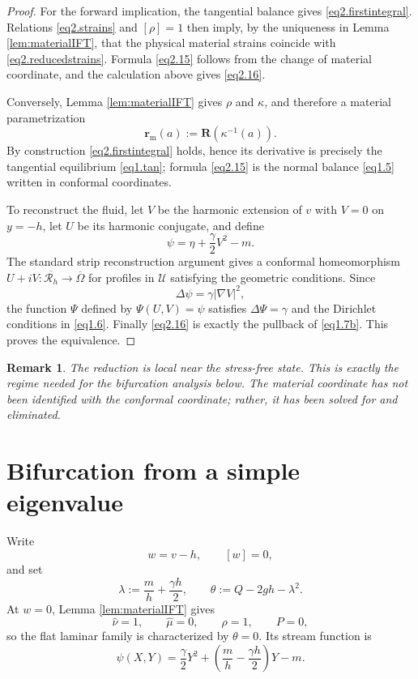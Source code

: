 \documentclass[12pt]{article}
\numberwithin{equation}{section}
\newtheorem{remark}[theorem]{Remark}
\numberwithin{equation}{section}
\begin{document}
\begin{proof}
For the forward implication, the tangential balance gives
\eqref{eq2.firstintegral}.  Relations \eqref{eq2.strains} and $[\rho]=1$ then imply,
by the uniqueness in Lemma \ref{lem:materialIFT}, that the physical material strains
coincide with \eqref{eq2.reducedstrains}.  Formula \eqref{eq2.15} follows from the
change of material coordinate, and the calculation above gives \eqref{eq2.16}.

Conversely, Lemma \ref{lem:materialIFT} gives $\rho$ and $\kappa$, and therefore a
material parametrization
\[
\mathbf r_{\mathrm m}(a)
:=\mathbf R(\kappa^{-1}(a)).
\]
By construction \eqref{eq2.firstintegral} holds, hence its derivative is precisely
the tangential equilibrium \eqref{eq1.tan}; formula \eqref{eq2.15} is the normal
balance \eqref{eq1.5} written in conformal coordinates.

To reconstruct the fluid, let $V$ be the harmonic extension of $v$ with $V=0$ on
$y=-h$, let $U$ be its harmonic conjugate, and define
\[
\psi=\eta+\frac{\gamma}{2}V^2-m.
\]
The standard strip reconstruction argument
\cite[Appendix A]{ConstantinV} gives a conformal homeomorphism
$U+iV:\overline{\mathcal R_h}\to\overline\Omega$ for profiles in $\mathcal U$ satisfying
the geometric conditions.  Since
\[
\Delta\psi=\gamma|\nabla V|^2,
\]
the function $\Psi$ defined by $\Psi(U,V)=\psi$ satisfies $\Delta\Psi=\gamma$ and the
Dirichlet conditions in \eqref{eq1.6}.  Finally \eqref{eq2.16} is exactly the pullback
of \eqref{eq1.7b}.  This proves the equivalence.
\end{proof}

\begin{remark}
The reduction is local near the stress-free state.  This is exactly the regime needed
for the bifurcation analysis below.  The material coordinate has not been identified
with the conformal coordinate; rather, it has been solved for and eliminated.
\end{remark}


\section{Bifurcation from a simple eigenvalue}

Write
\[
w=v-h,\qquad [w]=0,
\]
and set
\begin{equation}\label{eq3.3}
\lambda:=\frac mh+\frac{\gamma h}{2},
\qquad
\theta:=Q-2gh-\lambda^2.
\end{equation}
At $w=0$, Lemma \ref{lem:materialIFT} gives
\[
\widehat\nu=1,\qquad \widehat\mu=0,\qquad \rho=1,\qquad P=0,
\]
so the flat laminar family is characterized by $\theta=0$.  Its stream function is
\begin{equation}\label{eq3.5}
\psi(X,Y)
=
\frac{\gamma}{2}Y^2
+\left(\frac mh-\frac{\gamma h}{2}\right)Y-m.
\end{equation}
\end{document}

